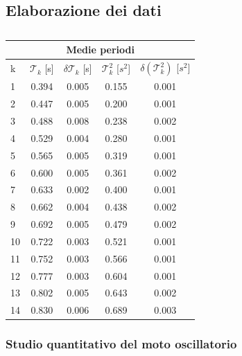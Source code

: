 \subsection{Elaborazione dei dati}

\begin{table}
    \centering
	\begin{tabular}{l c  c  c  c }
        \multicolumn{5}{c}{\textbf{Medie periodi}} \\
        \toprule
        k & $\mathcal{T}_k$ [s] & $\delta\mathcal{T}_k$ [s] & $\mathcal{T}_k^2$ [$s^2$] & $\delta(\mathcal{T}_k^2)$ [$s^2$] \\

        \midrule

        1 & 0.394		& 0.005		& 0.155		& 0.001	\\
        2 & 0.447		& 0.005		& 0.200		& 0.001	\\
        3 & 0.488		& 0.008		& 0.238		& 0.002	\\
        4 & 0.529		& 0.004		& 0.280		& 0.001	\\
        5 & 0.565		& 0.005		& 0.319		& 0.001	\\
        6 & 0.600		& 0.005		& 0.361		& 0.002	\\
        7 & 0.633		& 0.002		& 0.400		& 0.001	\\
        8 & 0.662		& 0.004		& 0.438		& 0.002	\\
        9 & 0.692		& 0.005		& 0.479		& 0.002	\\
        10 & 0.722		& 0.003		& 0.521		& 0.001	\\
        11 & 0.752		& 0.003		& 0.566		& 0.001	\\
        12 & 0.777		& 0.003		& 0.604		& 0.001	\\
        13 & 0.802		& 0.005		& 0.643		& 0.002	\\
        14 & 0.830		& 0.006		& 0.689		& 0.003	\\

        \bottomrule

	\end{tabular}
    \caption{}
    \label{tab:calcolati}
\end{table}

\subsubsection{Studio quantitativo del moto oscillatorio}

